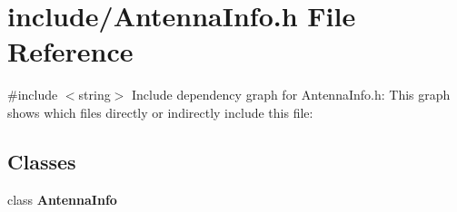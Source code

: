 \section{include/\+Antenna\+Info.h File Reference}
\label{_antenna_info_8h}
{\ttfamily \#include $<$string$>$}\newline
Include dependency graph for Antenna\+Info.\+h\+:
This graph shows which files directly or indirectly include this file\+:
\subsection*{Classes}
\begin{DoxyCompactItemize}
\item 
class \textbf{ Antenna\+Info}
\end{DoxyCompactItemize}
